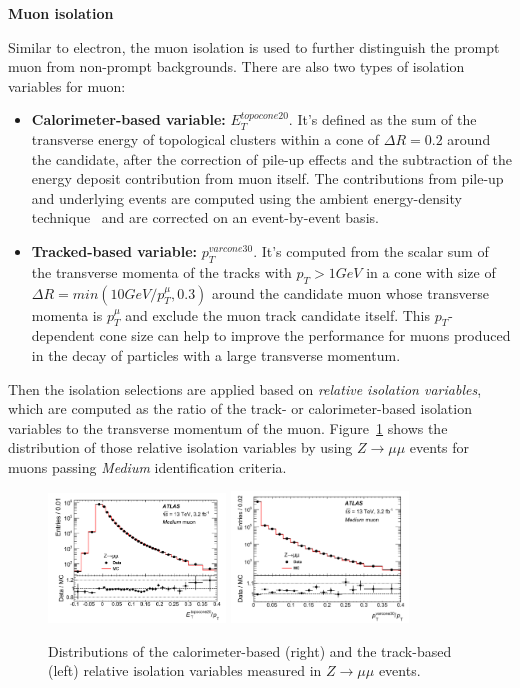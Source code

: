 \textbf{Muon isolation}

Similar to electron, the muon isolation is used to further distinguish the prompt muon from non-prompt backgrounds.
There are also two types of isolation variables for muon:
\begin{itemize}
	\item \textbf{Calorimeter-based variable:} $E_{T}^{topocone20}$. It's defined as the sum of the transverse energy of topological clusters within a cone of $\Delta R = 0.2$ around the candidate, after the correction of pile-up effects and the subtraction of the energy deposit contribution from muon itself.
        The contributions from pile-up and underlying events are computed using the ambient energy-density technique~\cite{CACCIARI2008119} and are corrected on an event-by-event basis.
	\item \textbf{Tracked-based variable:} $p_{T}^{varcone30}$. It's computed from the scalar sum of the transverse momenta of the tracks with $p_{T} > 1 GeV$ in a cone with size of $\Delta R = min (10 GeV/p_{T}^{\mu}, 0.3)$ around the candidate muon whose transverse momenta is $p_{T}^{\mu}$ and exclude the muon track candidate itself. This $p_{T}$-dependent cone size can help to improve the performance for muons produced in the decay of particles with a large transverse momentum.
\end{itemize}

Then the isolation selections are applied based on \textit{relative isolation variables}, 
which are computed as the ratio of the track- or calorimeter-based isolation variables to the transverse momentum of the muon.
Figure~\ref{fig:muon_iso} shows the distribution of those relative isolation variables by using $Z \rightarrow \mu\mu$ events for muons passing \textit{Medium} identification criteria.
\begin{figure}[!htb]
  \centering
  \includegraphics[width=0.42\textwidth]{figures/Simulation/muon_iso_calo.png}
  \includegraphics[width=0.42\textwidth]{figures/Simulation/muon_iso_track.png}
  \caption{Distributions of the calorimeter-based (right) and the track-based (left) relative isolation variables measured in $Z \rightarrow \mu\mu$ events. }
  \label{fig:muon_iso}
\end{figure}
